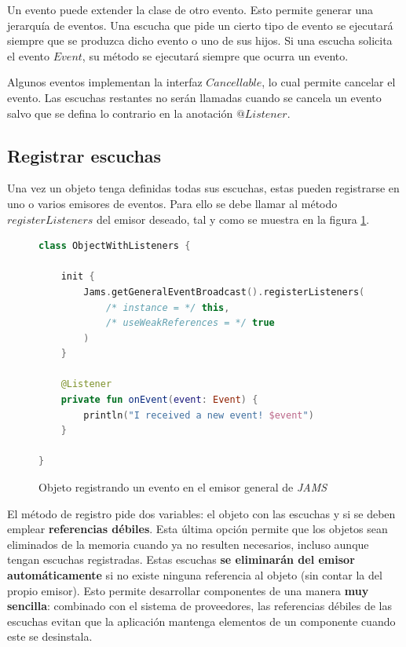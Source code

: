 Un evento puede extender la clase de otro evento.
Esto permite generar una jerarquía de eventos.
Una escucha que pide un cierto tipo de evento se ejecutará siempre
que se produzca dicho evento o uno de sus hijos.
Si una escucha solicita el evento $Event$,
su método se ejecutará siempre que ocurra un evento.

Algunos eventos implementan la interfaz $Cancellable$, lo cual permite cancelar el evento.
Las escuchas restantes no serán llamadas cuando se cancela un evento salvo que se defina lo contrario
en la anotación $@Listener$.

\subsection{Registrar escuchas}\label{subsec:registrar-escuchas}

Una vez un objeto tenga definidas todas sus escuchas, estas
pueden registrarse en uno o varios emisores de eventos.
Para ello se debe llamar al método $registerListeners$ del
emisor deseado, tal y como se muestra en la figura \ref{fig:event-registration}.

\begin{figure}[h]
    \centering
    \begin{lstlisting}[frame=single,label={lst:event-registration-use},language=Kotlin]
class ObjectWithListeners {

    init {
        Jams.getGeneralEventBroadcast().registerListeners(
            /* instance = */ this,
            /* useWeakReferences = */ true
        )
    }

    @Listener
    private fun onEvent(event: Event) {
        println("I received a new event! $event")
    }

}
    \end{lstlisting}
    \caption{Objeto registrando un evento en el emisor general de \textit{JAMS}}
    \label{fig:event-registration}
\end{figure}

El método de registro pide dos variables: el objeto
con las escuchas y si se deben emplear \textbf{referencias débiles}.
Esta última opción permite que los objetos sean eliminados de la memoria
cuando ya no resulten necesarios, incluso aunque tengan escuchas registradas.
Estas escuchas \textbf{se eliminarán del emisor automáticamente} si no existe
ninguna referencia al objeto (sin contar la del propio emisor).
Esto permite desarrollar componentes de una manera \textbf{muy sencilla}:
combinado con el sistema de proveedores, las referencias débiles
de las escuchas evitan que la aplicación mantenga elementos de un
componente cuando este se desinstala.

